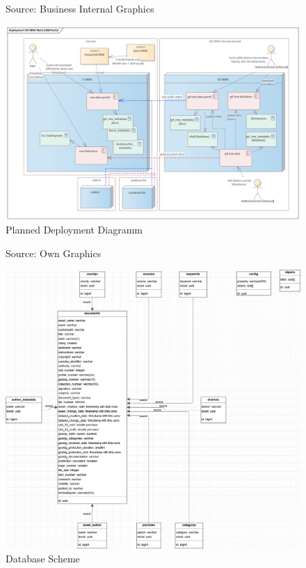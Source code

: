 \documentclass[11pt, titlepage, a4paper]{article}
\newcommand{\source}[1]{\caption*{Source: {#1}} }
\begin{document}
\begin{appendices}
    \begin{figure}[H]
        \caption{Planned Deployment Diagramm}
        \source{Business Internal Graphics \cite{conterraGDNRWMetaDAMPort2024}}
        \label{fig:deployment}
        \includegraphics[width=16cm]{deployment_.png}
        \centering
    \end{figure}
    \begin{figure}[H]
        \caption{Database Scheme}
        \source{Own Graphics}
        \label{fig:db}
        \includegraphics[width=16cm]{db3.png}
        \centering
    \end{figure}
    \begin{figure}[H]

\end{figure}
\end{appendices}
\end{document}
